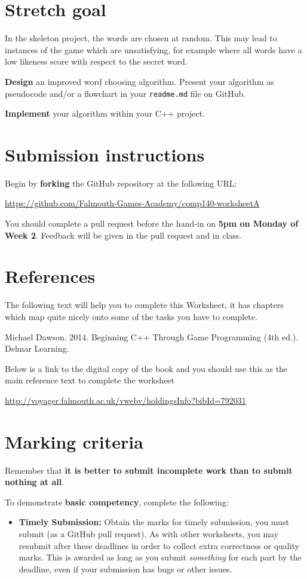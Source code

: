 \documentclass{../../../fal_assignment}
\begin{document}
\section{Stretch goal} \label{stretch-a}

In the skeleton project, the words are chosen at random.
This may lead to instances of the game which are unsatisfying, for example where all words
have a low likeness score with respect to the secret word.

\textbf{Design} an improved word choosing algorithm.
Present your algorithm as pseudocode and/or a flowchart in your \texttt{readme.md} file on GitHub.

\textbf{Implement} your algorithm within your C++ project.

\section*{Submission instructions}

Begin by \textbf{forking} the GitHub repository at the following URL:

\url{https://github.com/Falmouth-Games-Academy/comp140-worksheetA}

You should complete a pull request before the hand-in on \textbf{5pm on Monday of Week 2}. Feedback will be given in the pull request and in class.

\section*{References}
The following text will help you to complete this Worksheet, it has chapters which map quite nicely onto some of the tasks you have to complete.

Michael Dawson. 2014. Beginning C++ Through Game Programming (4th ed.). Delmar Learning. 

Below is a link to the digital copy of the book and you should use this as the main reference text to complete the worksheet

\url{http://voyager.falmouth.ac.uk/vwebv/holdingsInfo?bibId=792031}

\section*{Marking criteria}

Remember that \textbf{it is better to submit incomplete work than to submit nothing at all}. 

To demonstrate \textbf{basic competency}, complete the following:
\begin{itemize}
	\item \textbf{Timely Submission:} Obtain the marks for timely submission, you must submit (as a GitHub pull request).
	As with other worksheets, you may resubmit after these deadlines in order to collect extra correctness or quality marks.
	This is awarded as long as you submit \emph{something} for each part by the deadline,
	even if your submission has bugs or other issues.
\end{itemize} 
\end{document}
